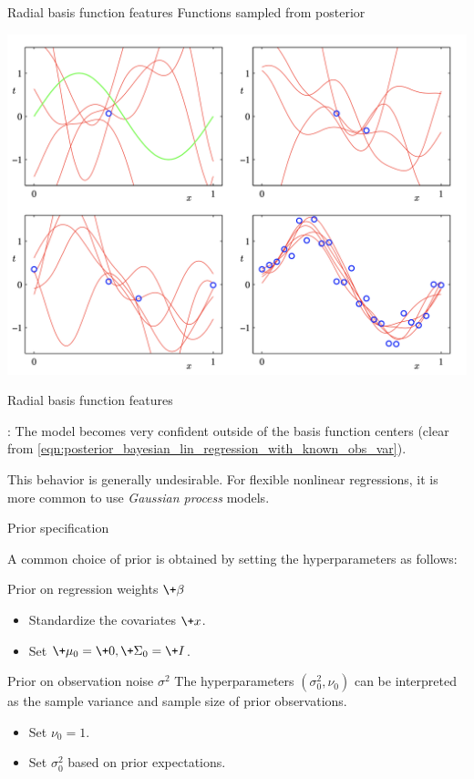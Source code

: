 \documentclass[10pt]{beamer}
\begin{document}
\begin{frame}{Radial basis function features}
Functions sampled from posterior
\begin{center}
\includegraphics[width=.8\textwidth]{images/bishop_RBF_posterior_samples}	
\end{center}

\end{frame}

\begin{frame}{Radial basis function features}

:  The model becomes very confident outside of the basis function centers {\scriptsize (clear from \eqref{eqn:posterior_bayesian_lin_regression_with_known_obs_var})}.

\vfill 
This behavior is generally undesirable. 
\vfill 
For flexible nonlinear regressions, it is more common to use \textit{Gaussian process} models. 
	
\end{frame}

\begin{frame}{Prior specification}

A common choice of prior is obtained by setting the hyperparameters as follows:

\begin{sblock}{Prior on regression weights $\+\beta$}
\begin{itemize}
\item Standardize the covariates $\+x$.
\item Set $\+\mu_0 =\+0, \+\Sigma_0 = \+I$.
\end{itemize}
\end{sblock}

\begin{sblock}{Prior on observation noise $\sigma^2$}
The hyperparameters $(\sigma_0^2,  \nu_0)$ can be interpreted as the sample variance and sample size of prior observations.

\begin{itemize}
\item Set $\nu_0=1$.
\item Set $\sigma_0^2$ based on prior expectations.
\end{itemize}
\end{sblock}
\end{frame}
\end{document}
